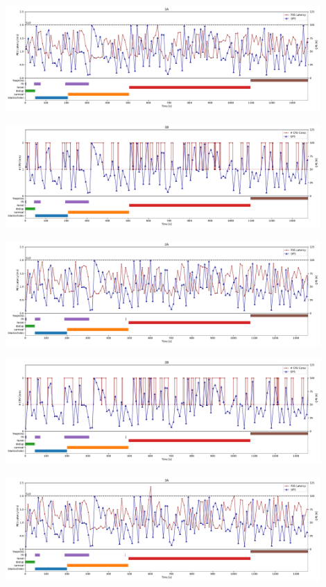 \documentclass[11pt]{article}
\begin{document}
\begin{enumerate}
    \begin{center}
    {\includegraphics[width=0.9\textwidth]{plot10/1A.pdf}}
    \end{center}
    \begin{center}
    {\includegraphics[width=0.9\textwidth]{plot10/1B.pdf}}
    \end{center}
    \begin{center}
    {\includegraphics[width=0.9\textwidth]{plot10/2A.pdf}}
    \end{center}
    \begin{center}
    {\includegraphics[width=0.9\textwidth]{plot10/2B.pdf}}
    \end{center}
    \begin{center}
    {\includegraphics[width=0.9\textwidth]{plot10/3A.pdf}}

\end{center}
\end{enumerate}
\end{document}
